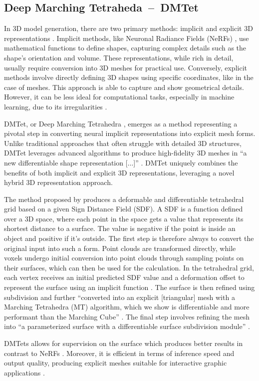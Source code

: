 \subsection{Deep Marching Tetraheda~--~DMTet}\label{DMTet}

In 3D model generation, there are two primary methods: implicit and explicit 3D representations \citep{shen2021DMTet}. Implicit methods, like Neuronal Radiance Fields (NeRFs) \citep{mildenhallNERF}, use mathematical functions to define shapes, capturing complex details such as the shape's orientation and volume. These representations, while rich in detail, usually require conversion into 3D meshes for practical use. Conversely, explicit methods involve directly defining 3D shapes using specific coordinates, like in the case of meshes. This approach is able to capture and show geometrical details. However, it can be less ideal for computational tasks, especially in machine learning, due to its irregularities \citep{michalkiewicz2019deep}.

DMTet, or Deep Marching Tetrahedra \citep{shen2021DMTet}, emerges as a method representing a pivotal step in converting neural implicit representations into explicit mesh forms. Unlike traditional approaches that often struggle with detailed 3D structures, DMTet leverages advanced algorithms to produce high-fidelity 3D meshes in ``a new differentiable shape representation [\(\ldots\)]'' \citep{shen2021DMTet}. DMTet uniquely combines the benefits of both implicit and explicit 3D representations, leveraging a novel hybrid 3D representation approach.

The method proposed by \citeauthor{shen2021DMTet} produces a deformable and differentiable tetrahedral grid based on a given Sign Distance Field (SDF). A SDF is a function defined over a 3D space, where each point in the space gets a value that represents its shortest distance to a surface. The value is negative if the point is inside an object and positive if it's outside. The first step is therefore always to convert the original input into such a form. Point clouds are transformed directly, while voxels undergo initial conversion into point clouds through sampling points on their surfaces, which can then be used for the calculation. In the tetrahedral grid, each vertex receives an initial predicted SDF value and a deformation offset to represent the surface using an implicit function \citep{shen2021DMTet}. The surface is then refined using subdivision and further ``converted into an explicit [triangular] mesh with a Marching Tetrahedra (MT) algorithm, which we show is differentiable and more performant than the Marching Cube'' \citep{shen2021DMTet}. The final step involves refining the mesh into ``a parameterized surface with a differentiable surface subdivision module'' \citep{shen2021DMTet}.

DMTets allows for supervision on the surface which produces better results in contrast to NeRFs \citep{shen2021DMTet}. Moreover, it is efficient in terms of inference speed and output quality, producing explicit meshes suitable for interactive graphic applications \citep{shen2021DMTet}.